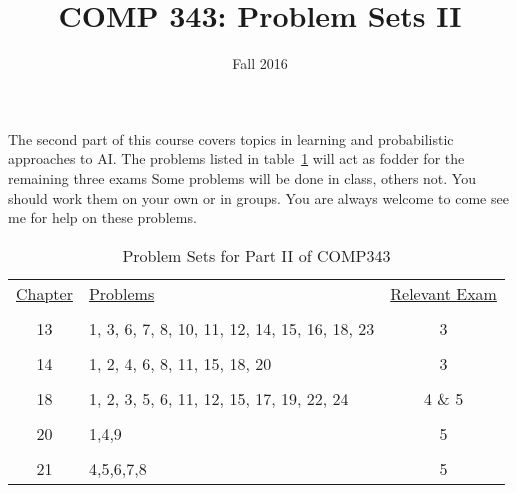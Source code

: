\documentclass[nobib]{tufte-handout}
\title{COMP 343: Problem Sets II}
\author{  }
\date{Fall 2016}
\begin{document}
\maketitle

The second part of this course covers topics in learning and probabilistic approaches to AI\@.  The problems listed in table~\ref{probs} will act as fodder for the remaining three exams  Some problems will be done in class, others not. You should work them on your own or in groups. You are always welcome to come see me for help on these problems.

\begin{table}[!ht]
\begin{center}
\begin{tabular}{clc}
  \underline{Chapter} & \underline{Problems} & \underline{Relevant Exam} \\ \\
   13 & 1, 3, 6, 7, 8, 10, 11, 12, 14, 15, 16, 18, 23 & 3 \\ \\
   14 & 1, 2, 4, 6, 8, 11, 15, 18, 20 & 3 \\ \\
   18 & 1, 2, 3, 5, 6, 11, 12, 15, 17, 19, 22, 24 & 4 \& 5 \\ \\
   20 & 1,4,9 & 5 \\ \\
   21 & 4,5,6,7,8 & 5
\end{tabular}
\end{center}
\caption{Problem Sets for Part II of COMP343}
\label{probs}
\end{table}
\end{document}
